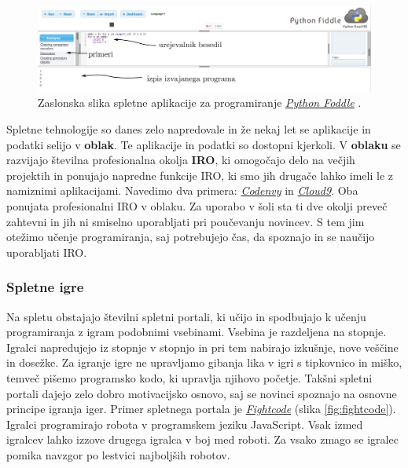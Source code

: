 \begin{figure}[h!]
    \includegraphics [width=1\linewidth, keepaspectratio =
    1] {./images/sc_web/PythonFiddle_01.jpg}
    \caption{Zaslonska slika spletne aplikacije za programiranje
      \emph{\href{http://pythonfiddle.com/}{Python Foddle}}
      \cite{web:pythonfiddle}.}
    \label{fig:scr:web:PyFiddle}
\end{figure}

Spletne tehnologije so danes zelo napredovale in že nekaj let se
aplikacije in podatki selijo v \textbf{oblak}. Te aplikacije in
podatki so dostopni kjerkoli. V \textbf{oblaku} se razvijajo
številna profesionalna okolja \textbf{IRO}, ki omogočajo delo na
večjih projektih in ponujajo napredne funkcije IRO, ki smo jih drugače
lahko imeli le z namiznimi aplikacijami. Navedimo dva primera:
\emph{\href{https://codenvy.com/}{Codenvy}} \cite{web:codeenvy} in
\emph{\href{https://c9.io/}{Cloud9}}\cite{web:cloud9}. Oba ponujata
profesionalni IRO v oblaku. Za uporabo v šoli sta ti dve okolji preveč
zahtevni in jih ni smiselno uporabljati pri poučevanju novincev. S
tem jim otežimo učenje programiranja, saj potrebujejo čas, da
spoznajo in se naučijo uporabljati IRO.

\subsubsection{Spletne igre}
\label{sec:spletne_igre}

Na spletu obstajajo številni spletni portali, ki učijo in spodbujajo k
učenju programiranja z igram podobnimi vsebinami. Vsebina je
razdeljena na stopnje. Igralci napredujejo iz stopnje v stopnjo in pri
tem nabirajo izkušnje, nove veščine in dosežke. Za igranje igre ne
upravljamo gibanja lika v igri s tipkovnico in miško, temveč pišemo
programsko kodo, ki upravlja njihovo početje. Takšni spletni portali
dajejo zelo dobro motivacijsko osnovo, saj se novinci spoznajo na
osnovne principe igranja iger. Primer spletnega portala je
\emph{\href{http://fightcodegame.com/}{Fightcode}}
\cite{web:fightcode} (slika \ref{fig:fightcode}). Igralci programirajo robota v programskem jeziku
JavaScript. Vsak izmed igralcev lahko izzove drugega igralca v boj med
roboti. Za vsako zmago se igralec pomika navzgor po lestvici
najboljših robotov.

